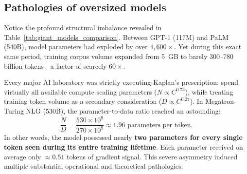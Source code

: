 \documentclass[../../main.tex]{subfiles}
\begin{document}
\begin{table}[htbp]
\centering
\caption{The race to scale: Landmark dense foundation models trained between 2020 and 2022.}
\label{tab:giant_models_comparison}
\end{table}

\subsection{Pathologies of oversized models}
\label{subsec:undertrained_oversized_pathology}

Notice the profound structural imbalance revealed in Table~\ref{tab:giant_models_comparison}. Between GPT-1 (117M) and PaLM (540B), model parameters had exploded by over \textbf{$4,600\times$}. Yet during this exact same period, training corpus volume expanded from 5~GB to barely 300--780 billion tokens---a factor of scarcely $60\times$.

Every major AI laboratory was strictly executing Kaplan's prescription: spend virtually all available compute scaling parameters ($N \propto C^{0.73}$), while treating training token volume as a secondary consideration ($D \propto C^{0.27}$). In Megatron-Turing NLG (530B), the parameter-to-data ratio reached an astounding:
\begin{equation}
\label{eq:oversized_nd_ratio}
\frac{N}{D} = \frac{530 \times 10^9}{270 \times 10^9} \approx 1.96 \text{ parameters per token}.
\end{equation}
In other words, the model possessed nearly \textbf{two parameters for every single token seen during its entire training lifetime}. Each parameter received on average only $\approx 0.51$ tokens of gradient signal. This severe asymmetry induced multiple substantial operational and theoretical pathologies:
\end{document}
